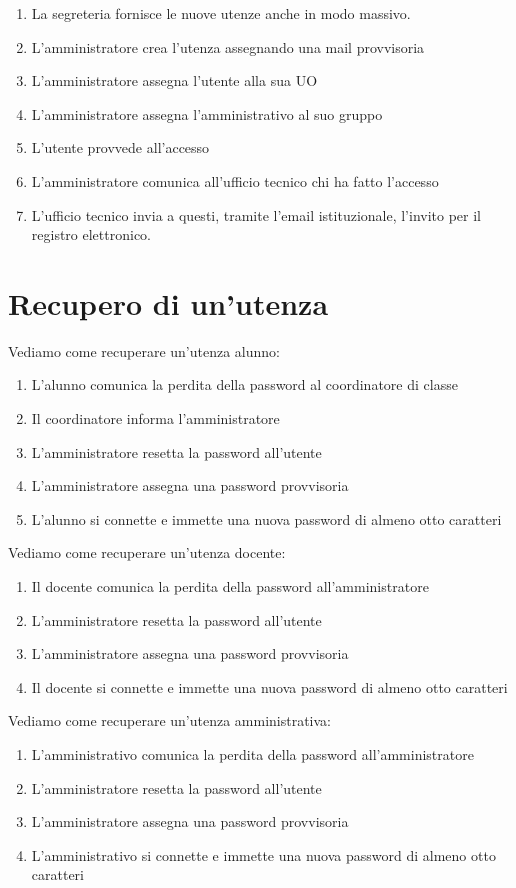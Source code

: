 \begin{enumerate}
	\item La segreteria fornisce le nuove utenze anche in modo massivo.
	\item L'amministratore crea l'utenza assegnando una mail provvisoria
	\item L'amministratore assegna l'utente alla sua UO
	\item L'amministratore assegna l'amministrativo al suo gruppo
	\item L'utente provvede all'accesso
	\item L'amministratore  comunica all'ufficio tecnico chi ha fatto l'accesso
	\item L'ufficio tecnico invia  a questi, tramite l'email istituzionale, 
	l'invito  per il registro elettronico.
\end{enumerate}
\section{Recupero di un'utenza}
Vediamo come recuperare un'utenza alunno:
\begin{enumerate}
	\item L'alunno comunica la perdita della password al coordinatore di classe
	\item Il coordinatore informa l'amministratore
	\item L'amministratore resetta la password all'utente
	\item L'amministratore assegna una password provvisoria 
	\item L'alunno si connette e immette una nuova password di almeno otto 
	caratteri 
\end{enumerate}
Vediamo come recuperare un'utenza docente:
\begin{enumerate}
	\item Il docente comunica la perdita della password all'amministratore
	\item L'amministratore resetta la password all'utente
	\item L'amministratore assegna una password provvisoria 
	\item Il docente si connette e immette una nuova password di almeno otto 
	caratteri 
\end{enumerate}
Vediamo come recuperare un'utenza amministrativa:
\begin{enumerate}
	\item L'amministrativo comunica la perdita della password all'amministratore
	\item L'amministratore resetta la password all'utente
	\item L'amministratore assegna una password provvisoria 
	\item L'amministrativo si connette e immette una nuova password di almeno 
	otto caratteri 
\end{enumerate}
